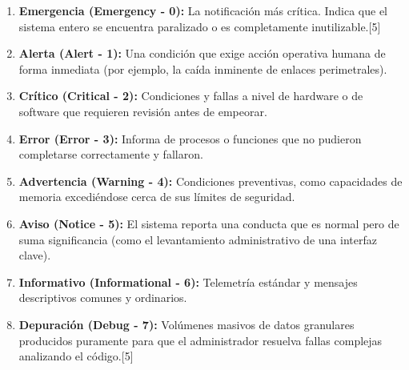 \documentclass[a4paper,12pt]{article}
\begin{document}
\begin{enumerate}
    \setcounter{enumi}{0}
    \item \textbf{Emergencia (Emergency - 0):} La notificación más crítica. Indica que el sistema entero se encuentra paralizado o es completamente inutilizable.[5]
    \item \textbf{Alerta (Alert - 1):} Una condición que exige acción operativa humana de forma inmediata (por ejemplo, la caída inminente de enlaces perimetrales).
    \item \textbf{Crítico (Critical - 2):} Condiciones y fallas a nivel de hardware o de software que requieren revisión antes de empeorar.
    \item \textbf{Error (Error - 3):} Informa de procesos o funciones que no pudieron completarse correctamente y fallaron.
    \item \textbf{Advertencia (Warning - 4):} Condiciones preventivas, como capacidades de memoria excediéndose cerca de sus límites de seguridad.
    \item \textbf{Aviso (Notice - 5):} El sistema reporta una conducta que es normal pero de suma significancia (como el levantamiento administrativo de una interfaz clave).
    \item \textbf{Informativo (Informational - 6):} Telemetría estándar y mensajes descriptivos comunes y ordinarios.
    \item \textbf{Depuración (Debug - 7):} Volúmenes masivos de datos granulares producidos puramente para que el administrador resuelva fallas complejas analizando el código.[5]
\end{enumerate}


\newpage
\end{document}
